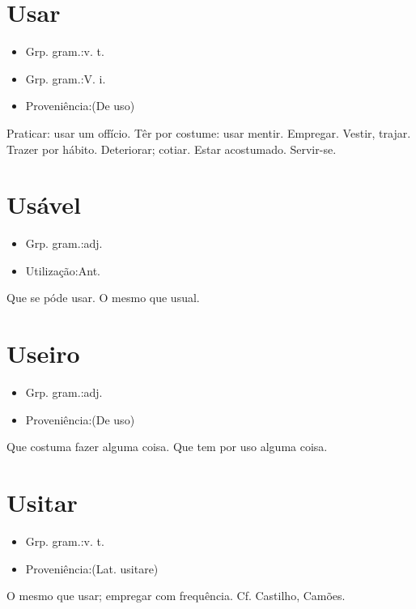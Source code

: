 \documentclass{article}
\begin{document}
\section{Usar}
\begin{itemize}
\item {Grp. gram.:v. t.}
\end{itemize}
\begin{itemize}
\item {Grp. gram.:V. i.}
\end{itemize}
\begin{itemize}
\item {Proveniência:(De \textunderscore uso\textunderscore )}
\end{itemize}
Praticar: \textunderscore usar um offício\textunderscore .
Têr por costume: \textunderscore usar mentir\textunderscore .
Empregar.
Vestir, trajar.
Trazer por hábito.
Deteriorar; cotiar.
Estar acostumado.
Servir-se.
\section{Usável}
\begin{itemize}
\item {Grp. gram.:adj.}
\end{itemize}
\begin{itemize}
\item {Utilização:Ant.}
\end{itemize}
Que se póde usar.
O mesmo que \textunderscore usual\textunderscore .
\section{Useiro}
\begin{itemize}
\item {Grp. gram.:adj.}
\end{itemize}
\begin{itemize}
\item {Proveniência:(De \textunderscore uso\textunderscore )}
\end{itemize}
Que costuma fazer alguma coisa.
Que tem por uso alguma coisa.
\section{Usitar}
\begin{itemize}
\item {Grp. gram.:v. t.}
\end{itemize}
\begin{itemize}
\item {Proveniência:(Lat. \textunderscore usitare\textunderscore )}
\end{itemize}
O mesmo que \textunderscore usar\textunderscore ; empregar com frequência. Cf. Castilho, \textunderscore Camões.\textunderscore 
\end{document}
